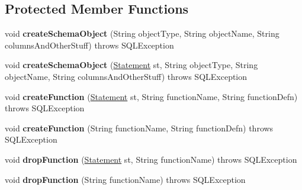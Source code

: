 \subsection*{Protected Member Functions}
\begin{DoxyCompactItemize}
\item 
\mbox{\label{classtestsuite_1_1_base_test_case_a43e16f16b388ad8133b17147588e6670}} 
void {\bfseries create\+Schema\+Object} (String object\+Type, String object\+Name, String columns\+And\+Other\+Stuff)  throws S\+Q\+L\+Exception 
\item 
\mbox{\label{classtestsuite_1_1_base_test_case_a7c9a8512d5ed0cfbe4b80a8f1b990b24}} 
void {\bfseries create\+Schema\+Object} (\mbox{\hyperlink{interfacecom_1_1mysql_1_1jdbc_1_1_statement}{Statement}} st, String object\+Type, String object\+Name, String columns\+And\+Other\+Stuff)  throws S\+Q\+L\+Exception 
\item 
\mbox{\label{classtestsuite_1_1_base_test_case_ab964ad68ca60ae9fef1deeef48b25c79}} 
void {\bfseries create\+Function} (\mbox{\hyperlink{interfacecom_1_1mysql_1_1jdbc_1_1_statement}{Statement}} st, String function\+Name, String function\+Defn)  throws S\+Q\+L\+Exception 
\item 
\mbox{\label{classtestsuite_1_1_base_test_case_a308f048150ff4bde942c42021b9b2a09}} 
void {\bfseries create\+Function} (String function\+Name, String function\+Defn)  throws S\+Q\+L\+Exception 
\item 
\mbox{\label{classtestsuite_1_1_base_test_case_ae40d8d8c945d750bd064ea265a1c48f3}} 
void {\bfseries drop\+Function} (\mbox{\hyperlink{interfacecom_1_1mysql_1_1jdbc_1_1_statement}{Statement}} st, String function\+Name)  throws S\+Q\+L\+Exception 
\item 
\mbox{\label{classtestsuite_1_1_base_test_case_a361ab79861482404c0eb3c637fbf92e2}} 
void {\bfseries drop\+Function} (String function\+Name)  throws S\+Q\+L\+Exception 
\item 
\mbox{\label{classtestsuite_1_1_base_test_case_a255cff56778ce81df619a9fb50a36696}} 

\end{DoxyCompactItemize}
